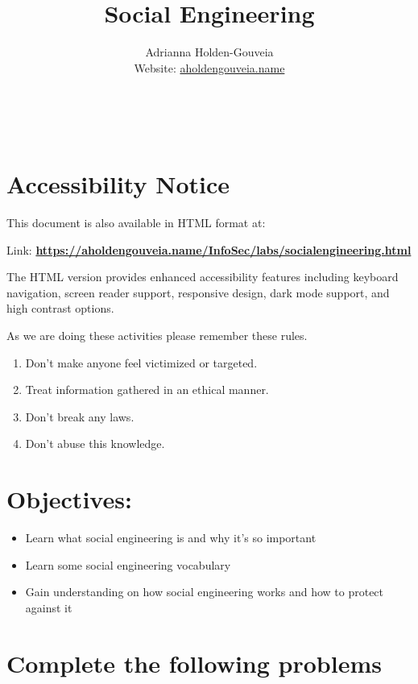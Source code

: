\documentclass[12pt]{article}
\title{Social Engineering}
\author{
        Adrianna Holden-Gouveia \\
        Website: \href{https://aholdengouveia.name}{aholdengouveia.name}\\ 
        \date{\vspace{-5ex}}
        \faGithub {: aholdengouveia} \\
        \faTwitter {: aholdengouveia} \\
        }
\begin{document}
    

\maketitle

\section*{Accessibility Notice}
This document is also available in HTML format at:

Link: \href{https://aholdengouveia.name/InfoSec/labs/socialengineering.html}{\textbf{https://aholdengouveia.name/InfoSec/labs/socialengineering.html}}

The HTML version provides enhanced accessibility features including keyboard navigation, screen reader support, responsive design, dark mode support, and high contrast options.



As we are doing these activities please remember these rules.
\begin{enumerate}
    \item Don't make anyone feel victimized or targeted.
    \item Treat information gathered in an ethical manner. 
    \item Don't break any laws. 
    \item Don't abuse this knowledge. 
\end{enumerate}

    
    


\section*{Objectives:}
\begin{itemize}
    \item Learn what social engineering is and why it's so important
    \item Learn some social engineering vocabulary
    \item Gain understanding on how social engineering works and how to protect against it
\end{itemize}
\section*{Complete the following problems}
\end{document}
